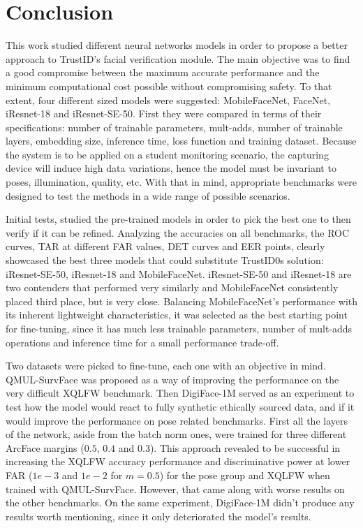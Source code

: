 \documentclass[class=report, crop=false, a4paper, 12pt]{standalone}
\begin{document}
\section{Conclusion}
\par This work studied different neural networks models in order to propose a better approach to TrustID's facial verification module. The main objective was to find a good compromise between the maximum accurate performance and the minimum computational cost possible without compromising safety. To that extent, four different sized models were suggested: MobileFaceNet, FaceNet, iResnet-18 and iResnet-SE-50. First they were compared in terms of their specifications: number of trainable parameters, mult-adds, number of trainable layers, embedding size, inference time, loss function and training dataset. Because the system is to be applied on a student monitoring scenario, the capturing device will induce high data variations, hence the model must be invariant to poses, illumination, quality, etc. With that in mind, appropriate benchmarks were designed to test the methods in a wide range of possible scenarios.

\par Initial tests, studied the pre-trained models in order to pick the best one to then verify if it can be refined. Analyzing the accuracies on all benchmarks, the ROC curves, TAR at different FAR values, DET curves and EER points, clearly showcased the best three models that could substitute TrustID0s solution: iResnet-SE-50, iResnet-18 and MobileFaceNet. iResnet-SE-50 and iResnet-18 are two contenders that performed very similarly and MobileFaceNet consistently placed third place, but is very close. Balancing MobileFaceNet's performance with its inherent lightweight characteristics, it was selected as the best starting point for fine-tuning, since it has much less trainable parameters, number of mult-adds operations and inference time for a small performance trade-off.

\par Two datasets were picked to fine-tune, each one with an objective in mind. QMUL-SurvFace was proposed as a way of improving the performance on the very difficult XQLFW benchmark. Then DigiFace-1M served as an experiment to test how the model would react to fully synthetic ethically sourced data, and if it would improve the performance on pose related benchmarks. First all the layers of the network, aside from the batch norm ones, were trained for three different ArcFace margins ($0.5$, $0.4$ and $0.3$). This approach revealed to be successful in increasing the XQLFW accuracy performance and discriminative power at lower FAR ($1e-3$ and $1e-2$ for $m=0.5$) for the pose group and XQLFW when trained with QMUL-SurvFace. However, that came along with worse results on the other benchmarks. On the same experiment, DigiFace-1M didn't produce any results worth mentioning, since it only deteriorated the model's results.  
\end{document}
